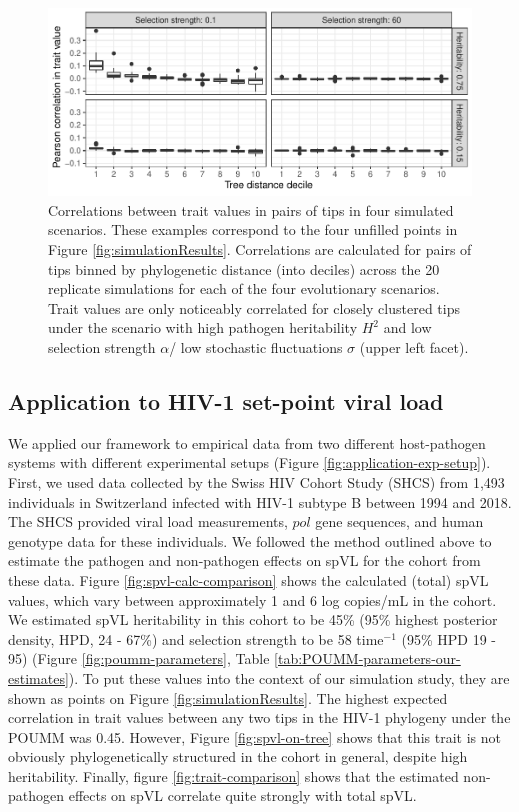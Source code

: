 \documentclass[11pt]{article}
\begin{document}
\begin{linenumbers}
\begin{figure}[H]
\begin{center}
    \includegraphics[width = \linewidth]{figures/tip_trait_correlation.pdf}
	\caption{Correlations between trait values in pairs of tips in four simulated scenarios. These examples correspond to the four unfilled points in Figure \ref{fig:simulationResults}. Correlations are calculated for pairs of tips binned by phylogenetic distance (into deciles) across the 20 replicate simulations for each of the four evolutionary scenarios. Trait values are only noticeably correlated for closely clustered tips under the scenario with high pathogen heritability $H^2$ and low selection strength $\alpha$/ low stochastic fluctuations $\sigma$ (upper left facet).}
	\label{fig:tip-trait-correlation}
	\end{center}
\end{figure}

\subsection*{Application to HIV-1 set-point viral load}

We applied our framework to empirical data from two different host-pathogen systems with different experimental setups (Figure \ref{fig:application-exp-setup}). First, we used data collected by the Swiss HIV Cohort Study (SHCS) from 1,493 individuals in Switzerland infected with HIV-1 subtype B between 1994 and 2018. The SHCS provided viral load measurements, $pol$ gene sequences, and human genotype data for these individuals. We followed the method outlined above to estimate the pathogen and non-pathogen effects on spVL for the cohort from these data. Figure \ref{fig:spvl-calc-comparison} shows the calculated (total) spVL values, which vary between approximately 1 and 6 log copies/mL in the cohort.  We estimated spVL heritability in this cohort to be 45\% (95\% highest posterior density, HPD, 24 - 67\%) and selection strength to be 58 time$^{-1}$ (95\% HPD 19 - 95) (Figure \ref{fig:poumm-parameters}, Table \ref{tab:POUMM-parameters-our-estimates}). To put these values into the context of our simulation study, they are shown as points on Figure \ref{fig:simulationResults}. The highest expected correlation in trait values between any two tips in the HIV-1 phylogeny under the POUMM was 0.45. However, Figure \ref{fig:spvl-on-tree} shows that this trait is not obviously phylogenetically structured in the cohort in general, despite high heritability. Finally, figure \ref{fig:trait-comparison} shows that the estimated non-pathogen effects on spVL correlate quite strongly with total spVL. 


\end{linenumbers}
\end{document}
